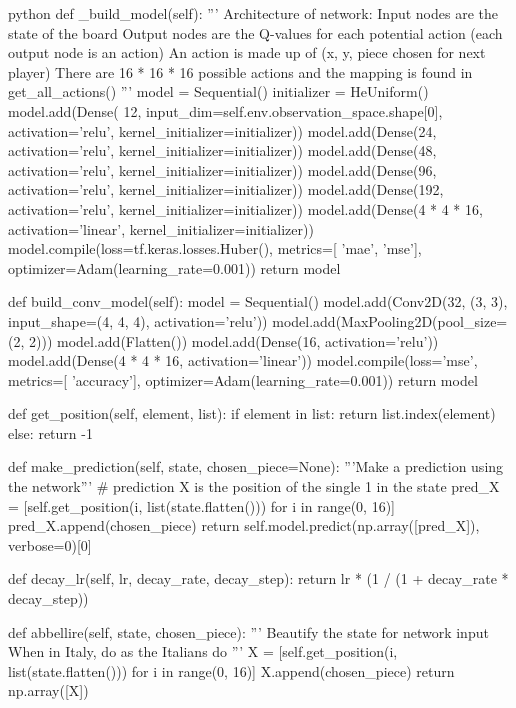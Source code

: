 \begin{mintedbox}{python}
    def _build_model(self):
        '''
        Architecture of network:
        Input nodes are the state of the board
        Output nodes are the Q-values for each potential action (each output node is an action)
        An action is made up of (x, y, piece chosen for next player)
        There are 16 * 16 * 16 possible actions and the mapping is found in get_all_actions()
        '''
        model = Sequential()
        initializer = HeUniform()
        model.add(Dense(
            12, input_dim=self.env.observation_space.shape[0], activation='relu', kernel_initializer=initializer))
        model.add(Dense(24, activation='relu', kernel_initializer=initializer))
        model.add(Dense(48, activation='relu', kernel_initializer=initializer))
        model.add(Dense(96, activation='relu', kernel_initializer=initializer))
        model.add(Dense(192, activation='relu',
                    kernel_initializer=initializer))
        model.add(Dense(4 * 4 * 16, activation='linear',
                    kernel_initializer=initializer))
        model.compile(loss=tf.keras.losses.Huber(), metrics=[
                        'mae', 'mse'], optimizer=Adam(learning_rate=0.001))
        return model

    def build_conv_model(self):
        model = Sequential()
        model.add(Conv2D(32, (3, 3), input_shape=(4, 4, 4), activation='relu'))
        model.add(MaxPooling2D(pool_size=(2, 2)))
        model.add(Flatten())
        model.add(Dense(16, activation='relu'))
        model.add(Dense(4 * 4 * 16, activation='linear'))
        model.compile(loss='mse', metrics=[
                        'accuracy'], optimizer=Adam(learning_rate=0.001))
        return model

    def get_position(self, element, list):
        if element in list:
            return list.index(element)
        else:
            return -1

    def make_prediction(self, state, chosen_piece=None):
        '''Make a prediction using the network'''
        # prediction X is the position of the single 1 in the state
        pred_X = [self.get_position(i, list(state.flatten()))
                    for i in range(0, 16)]
        pred_X.append(chosen_piece)
        return self.model.predict(np.array([pred_X]), verbose=0)[0]

    def decay_lr(self, lr, decay_rate, decay_step):
        return lr * (1 / (1 + decay_rate * decay_step))

    def abbellire(self, state, chosen_piece):
        '''
        Beautify the state for network input
        When in Italy, do as the Italians do
        '''
        X = [self.get_position(i, list(state.flatten())) for i in range(0, 16)]
        X.append(chosen_piece)
        return np.array([X])


\end{mintedbox}
